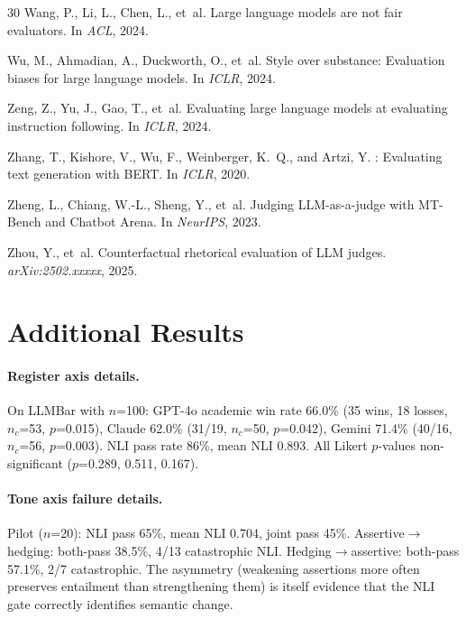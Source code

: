 \documentclass[11pt,a4paper]{article}
\begin{document}
\begin{thebibliography}{30}
Wang, P., Li, L., Chen, L., et~al.
\newblock Large language models are not fair evaluators.
\newblock In \emph{ACL}, 2024.

Wu, M., Ahmadian, A., Duckworth, O., et~al.
\newblock Style over substance: Evaluation biases for large language models.
\newblock In \emph{ICLR}, 2024.

Zeng, Z., Yu, J., Gao, T., et~al.
\newblock Evaluating large language models at evaluating instruction following.
\newblock In \emph{ICLR}, 2024.

Zhang, T., Kishore, V., Wu, F., Weinberger, K.~Q., and Artzi, Y.
: Evaluating text generation with {BERT}.
\newblock In \emph{ICLR}, 2020.

Zheng, L., Chiang, W.-L., Sheng, Y., et~al.
\newblock Judging {LLM}-as-a-judge with {MT}-Bench and Chatbot Arena.
\newblock In \emph{NeurIPS}, 2023.

Zhou, Y., et~al.
\newblock Counterfactual rhetorical evaluation of {LLM} judges.
\newblock \emph{arXiv:2502.xxxxx}, 2025.

\end{thebibliography}

\appendix
\section{Additional Results}

\paragraph{Register axis details.}
On LLMBar with $n$=100: GPT-4o academic win rate 66.0\% (35 wins, 18 losses, $n_c$=53, $p$=0.015), Claude 62.0\% (31/19, $n_c$=50, $p$=0.042), Gemini 71.4\% (40/16, $n_c$=56, $p$=0.003). NLI pass rate 86\%, mean NLI 0.893. All Likert $p$-values non-significant ($p$=0.289, 0.511, 0.167).

\paragraph{Tone axis failure details.}
Pilot ($n$=20): NLI pass 65\%, mean NLI 0.704, joint pass 45\%. Assertive$\to$hedging: both-pass 38.5\%, 4/13 catastrophic NLI. Hedging$\to$assertive: both-pass 57.1\%, 2/7 catastrophic. The asymmetry (weakening assertions more often preserves entailment than strengthening them) is itself evidence that the NLI gate correctly identifies semantic change.
\end{document}
